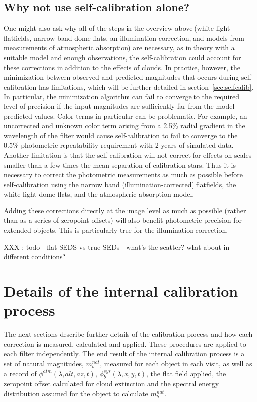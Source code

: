 \documentclass[12pt,preprint]{aastex}
\begin{document}
\subsection{Why not use self-calibration alone?}

One might also ask why all of the steps in the overview above
(white-light flatfields, narrow band dome flats, an illumination
correction, and models from measurements of atmospheric absorption)
are necessary, as in theory with a suitable model and enough observations, the self-calibration could account for
these corrections in addition to the effects of clouds. In practice,
however, the minimization between observed and predicted magnitudes
that occurs during self-calibration has limitations, which will be
further detailed in section~\ref{sec:selfcalib}.  In particular, the
minimization algorithm can fail to converge to the required level of
precision if the input magnitudes are sufficiently far from the model
predicted values.  Color terms in particular can be problematic. For
example, an uncorrected and unknown color term arising from a 2.5\%
radial gradient in the wavelength of the filter would cause
self-calibration to fail to converge to the 0.5\% photometric
repeatability requirement with 2 years of simulated data. Another
limitation is that the self-calibration will not correct for
effects on scales smaller than a few times the mean separation of
calibration stars. Thus it is necessary to correct the photometric
measurements as much as possible before self-calibration using the
narrow band (illumination-corrected) flatfields, the white-light dome
flats, and the atmospheric absorption model.

Adding these corrections directly at the image level as much as
possible (rather than as a series of zeropoint offsets) will also
benefit photometric precision for extended objects. This is
particularly true for the illumination correction.


XXX  : todo - flat SEDS vs true SEDs -  what's the scatter? what about
in different conditions? 

\section{Details of the internal calibration process}

The next sections describe further details of the calibration process
and how each correction is measured, calculated and applied. These
procedures are applied to each filter independently. The end
result of the internal calibration process is a set of natural
magnitudes, $m_b^{nat}$, measured for each object in each visit, as
well as a record of $\phi^{atm}(\lambda,alt,az,t)$,
$\phi_b^{sys}(\lambda,x,y,t)$, the flat field applied, the
zeropoint offset calculated for cloud extinction and the spectral
energy distribution assumed for the object to calculate $m_b^{nat}$.
\end{document}
